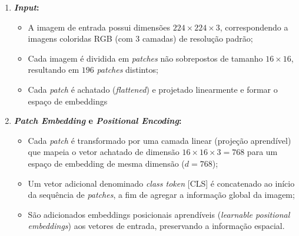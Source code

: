 \begin{enumerate}

    \item \textbf{\textit{Input}:}
    \begin{itemize}
        \item A imagem de entrada possui dimensões $224\times224\times3$, correspondendo a imagens coloridas RGB (com 3 camadas) de resolução padrão;
        \item Cada imagem é dividida em \textit{patches} não sobrepostos de tamanho $16\times16$, resultando em $196$ \textit{patches} distintos;
        \item Cada \textit{patch} é achatado (\textit{flattened}) e projetado linearmente e formar o espaço de embeddings
    \end{itemize}
    
    \item \textbf{\textit{Patch Embedding} e \textit{Positional Encoding}:}
    \begin{itemize}
        \item Cada \textit{patch} é transformado por uma camada linear (projeção aprendível) que mapeia o vetor achatado de dimensão $16\times16\times3 = 768$ para um espaço de embedding de mesma dimensão ($d=768$);
        \item Um vetor adicional denominado \textit{class token} [CLS] é concatenado ao início da sequência de \textit{patches}, a fim de agregar a informação global da imagem;
        \item São adicionados embeddings posicionais aprendíveis (\textit{learnable positional embeddings}) aos vetores de entrada, preservando a informação espacial.
    \end{itemize}


\end{enumerate}

